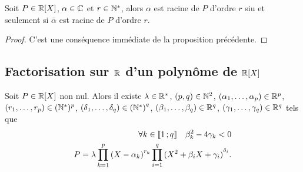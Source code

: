 \begin{prop}
  Soit \(P \in \mathbb{R}[X]\), \(\alpha \in \mathbb{C}\) et \(r \in \mathbb{N}^*\), alors \(\alpha\) 
  est racine de \(P\) d'ordre \(r\) siu et seulement si \(\bar{\alpha}\) est 
  racine de \(P\) d'ordre \(r\).
\end{prop}
\begin{proof}
  C'est une conséquence immédiate de la proposition précédente.
\end{proof}

\subsection{Factorisation sur \(\mathbb{R}\) d'un polynôme de \(\mathbb{R}[X]\)}

\begin{theo}
  Soit \(P \in \mathbb{R}[X]\) non nul. Alors il existe \(\lambda \in \mathbb{R}^*\), \((p,q) 
  \in \mathbb{N}^2\), \((\alpha_1, \ldots, \alpha_p) \in \mathbb{R}^p\), \((r_1, \ldots, r_p) 
  \in (\mathbb{N}^*)^p\), \((\delta_1, \ldots, \delta_q) \in {(\mathbb{N}^*)}^q\), \((\beta_1, 
  \ldots, \beta_q) \in \mathbb{R}^q\), \((\gamma_1, \ldots, \gamma_q) \in \mathbb{R}^q\) tels 
  que
  \begin{align}
    \forall k \in \mathopen{\llbracket}1\mathclose{}\mathpunct{};q\mathclose{\rrbracket} \quad \beta_k^2 - 4\gamma_k <0\\
    P = \lambda \prod_{k = 1}^p {(X-\alpha_k)}^{r_k} \prod_{i = 1}^q{(X^2+\beta_i 
    X+\gamma_i)}^{\delta_i}.
  \end{align}
\end{theo}
